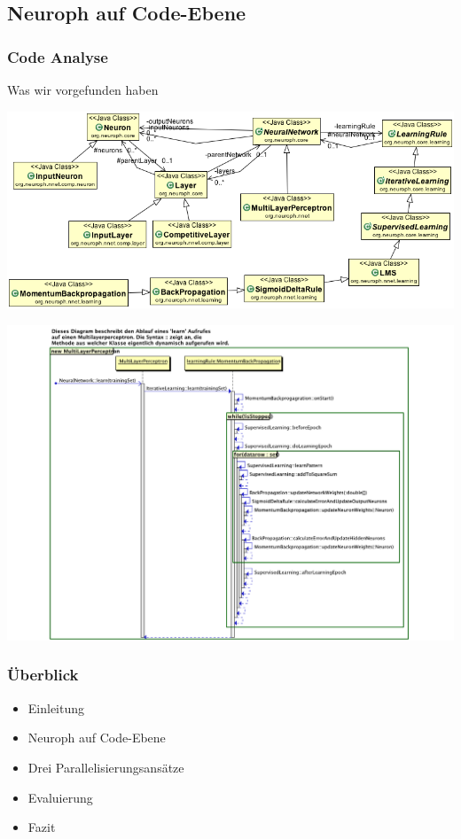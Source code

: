 \documentclass[18pt]{beamer}
\begin{document}
	\subsection{Neuroph auf Code-Ebene}
	\begin{frame}[allowframebreaks]\frametitle{Code Analyse}
		\begin{block}{Was wir vorgefunden haben}
			\begin{center}
				\includegraphics[scale=0.4]{images/Klassendiagramm.png}
			\end{center}
		\end{block}
	
	\framebreak
			\begin{center}
			  \includegraphics[scale=0.4]{images/Learn.pdf} 
			\end{center}
	\end{frame}
	
	\begin{frame}[c]\frametitle{Überblick}
		\begin{itemize}
		   \item Einleitung \checkmark
		   \item Neuroph auf Code-Ebene \checkmark
		   \item Drei Parallelisierungsansätze
		   \item Evaluierung
		   \item Fazit
		\end{itemize}
	\end{frame}
	
\end{document}
